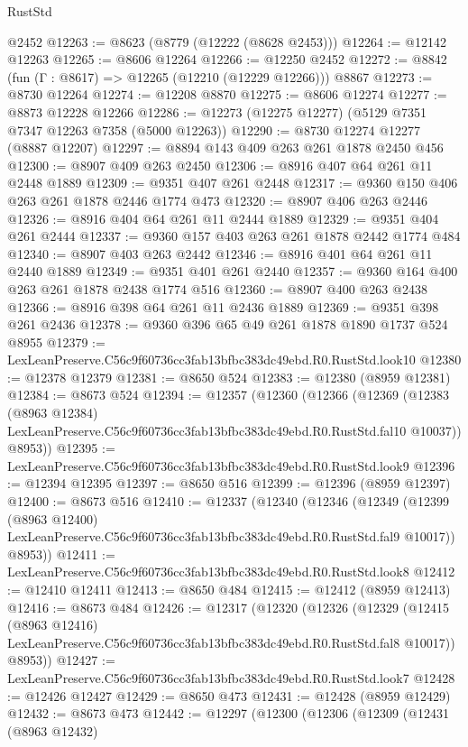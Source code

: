 \begin{lexlean}{RustStd}
\begin{coremodule}
    @2452
@12263 := @8623 (@8779 (@12222 (@8628 @2453)))
@12264 := @12142 @12263
@12265 := @8606 @12264
@12266 := @12250 @2452
@12272 := @8842 (fun (Γ : @8617) => @12265 (@12210 (@12229 @12266))) @8867
@12273 := @8730 @12264
@12274 := @12208 @8870
@12275 := @8606 @12274
@12277 := @8873 @12228 @12266
@12286 := @12273 (@12275 @12277) (@5129 @7351 @7347 @12263 @7358 (@5000 @12263))
@12290 := @8730 @12274 @12277 (@8887 @12207)
@12297 := @8894 @143 @409 @263 @261 @1878 @2450 @456
@12300 := @8907 @409 @263 @2450
@12306 := @8916 @407 @64 @261 @11 @2448 @1889
@12309 := @9351 @407 @261 @2448
@12317 := @9360 @150 @406 @263 @261 @1878 @2446 @1774 @473
@12320 := @8907 @406 @263 @2446
@12326 := @8916 @404 @64 @261 @11 @2444 @1889
@12329 := @9351 @404 @261 @2444
@12337 := @9360 @157 @403 @263 @261 @1878 @2442 @1774 @484
@12340 := @8907 @403 @263 @2442
@12346 := @8916 @401 @64 @261 @11 @2440 @1889
@12349 := @9351 @401 @261 @2440
@12357 := @9360 @164 @400 @263 @261 @1878 @2438 @1774 @516
@12360 := @8907 @400 @263 @2438
@12366 := @8916 @398 @64 @261 @11 @2436 @1889
@12369 := @9351 @398 @261 @2436
@12378 := @9360 @396 @65 @49 @261 @1878 @1890 @1737 @524 @8955
@12379 := LexLeanPreserve.C56c9f60736cc3fab13bfbc383dc49ebd.R0.RustStd.look10
@12380 := @12378 @12379
@12381 := @8650 @524
@12383 := @12380 (@8959 @12381)
@12384 := @8673 @524
@12394 := @12357
    (@12360
      (@12366
        (@12369
          (@12383
            (@8963 @12384)
            LexLeanPreserve.C56c9f60736cc3fab13bfbc383dc49ebd.R0.RustStd.fal10
            @10037))
        @8953))
@12395 := LexLeanPreserve.C56c9f60736cc3fab13bfbc383dc49ebd.R0.RustStd.look9
@12396 := @12394 @12395
@12397 := @8650 @516
@12399 := @12396 (@8959 @12397)
@12400 := @8673 @516
@12410 := @12337
    (@12340
      (@12346
        (@12349
          (@12399
            (@8963 @12400)
            LexLeanPreserve.C56c9f60736cc3fab13bfbc383dc49ebd.R0.RustStd.fal9
            @10017))
        @8953))
@12411 := LexLeanPreserve.C56c9f60736cc3fab13bfbc383dc49ebd.R0.RustStd.look8
@12412 := @12410 @12411
@12413 := @8650 @484
@12415 := @12412 (@8959 @12413)
@12416 := @8673 @484
@12426 := @12317
    (@12320
      (@12326
        (@12329
          (@12415
            (@8963 @12416)
            LexLeanPreserve.C56c9f60736cc3fab13bfbc383dc49ebd.R0.RustStd.fal8
            @10017))
        @8953))
@12427 := LexLeanPreserve.C56c9f60736cc3fab13bfbc383dc49ebd.R0.RustStd.look7
@12428 := @12426 @12427
@12429 := @8650 @473
@12431 := @12428 (@8959 @12429)
@12432 := @8673 @473
@12442 := @12297
    (@12300
      (@12306
        (@12309
          (@12431
            (@8963 @12432)

\end{coremodule}
\end{lexlean}
